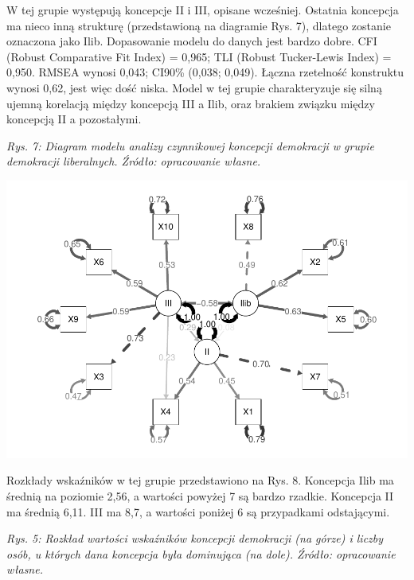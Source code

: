 \documentclass[12pt]{article}
\begin{document}
W tej grupie występują koncepcje II i III, opisane wcześniej. Ostatnia koncepcja ma nieco inną strukturę (przedstawioną na diagramie Rys. 7), dlatego zostanie oznaczona jako Ilib. Dopasowanie modelu do danych jest bardzo dobre. CFI (Robust Comparative Fit Index) = 0,965; TLI (Robust Tucker-Lewis Index) = 0,950. RMSEA wynosi 0,043; CI90\% (0,038; 0,049). Łączna rzetelność konstruktu wynosi 0,62, jest więc dość niska. Model w tej grupie charakteryzuje się silną ujemną korelacją między koncepcją III a Ilib, oraz brakiem związku między koncepcją II a pozostałymi.

\emph{Rys. 7: Diagram modelu analizy czynnikowej koncepcji demokracji w grupie demokracji liberalnych. Źródło: opracowanie własne.}

\begin{center}\includegraphics{text_ASA_files/figure-latex/diagram-west-1} \end{center}

Rozkłady wskaźników w tej grupie przedstawiono na Rys. 8. Koncepcja Ilib ma średnią na poziomie 2,56, a wartości powyżej 7 są bardzo rzadkie. Koncepcja II ma średnią 6,11. III ma 8,7, a wartości poniżej 6 są przypadkami odstającymi.

\emph{Rys. 5: Rozkład wartości wskaźników koncepcji demokracji (na górze) i liczby osób, u których dana koncepcja była dominująca (na dole). Źródło: opracowanie własne.}
\end{document}
